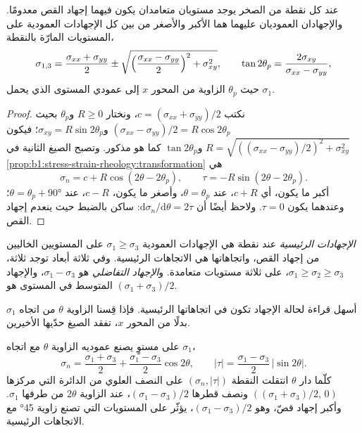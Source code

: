 \begin{theorem}\label{thm:b1:stress-strain-rheology:principal}
عند كل نقطة من الصخر يوجد مستويان متعامدان يكون فيهما إجهاد القص معدومًا. والإجهادان العموديان عليهما هما الأكبر والأصغر من بين كل الإجهادات العمودية على المستويات المارّة بالنقطة،
\[
  \sigma_{1,3} = \frac{\sigma_{xx}+\sigma_{yy}}{2} \pm
  \sqrt{\Bigl(\frac{\sigma_{xx}-\sigma_{yy}}{2}\Bigr)^2 + \sigma_{xy}^2},
  \qquad \tan2\theta_p = \frac{2\sigma_{xy}}{\sigma_{xx}-\sigma_{yy}},
\]
حيث $\theta_p$ الزاوية من المحور $x$ إلى عمودي المستوى الذي يحمل $\sigma_1$.
\end{theorem}

\begin{proof}
نكتب $c = (\sigma_{xx}+\sigma_{yy})/2$، ونختار $R \ge 0$ و$\theta_p$ بحيث $(\sigma_{xx}-\sigma_{yy})/2 = R\cos2\theta_p$ و$\sigma_{xy} = R\sin2\theta_p$؛ فيكون $R = \sqrt{((\sigma_{xx}-\sigma_{yy})/2)^2 + \sigma_{xy}^2}$ و$\tan2\theta_p$ كما هو مذكور. وتصبح الصيغ الثانية في \cref{prop:b1:stress-strain-rheology:transformation} هي
\[
  \sigma_n = c + R\cos(2\theta - 2\theta_p), \qquad \tau = -R\sin(2\theta - 2\theta_p).
\]
 أكبر ما يكون، أي $c + R$، عند $\theta = \theta_p$، وأصغر ما يكون، $c - R$، عند $\theta = \theta_p + \ang{90}$؛ وعندهما يكون $\tau = 0$. ولاحظ أيضًا أن $\mathrm d\sigma_n/\mathrm d\theta = 2\tau$:  ساكن بالضبط حيث ينعدم إجهاد القص.
\end{proof}

\begin{definition}\label{def:b1:stress-strain-rheology:principal}
\emph{الإجهادات الرئيسية} عند نقطة هي الإجهادات العمودية $\sigma_1 \ge \sigma_3$ على المستويين الخاليين من إجهاد القص، واتجاهاتها هي الاتجاهات الرئيسية. وفي ثلاثة أبعاد توجد ثلاثة، $\sigma_1 \ge \sigma_2 \ge \sigma_3$، على ثلاثة مستويات متعامدة. و\emph{الإجهاد التفاضلي} هو $\sigma_1 - \sigma_3$، والإجهاد المتوسط في المستوى هو $(\sigma_1+\sigma_3)/2$.
\end{definition}

أسهل قراءة لحالة الإجهاد تكون في اتجاهاتها الرئيسية. فإذا قِسنا الزاوية $\theta$ من اتجاه $\sigma_1$ بدلًا من المحور $x$، تفقد الصيغ حدّيها الأخيرين.

\begin{proposition}\label{prop:b1:stress-strain-rheology:mohr}
على مستوٍ يصنع عموديه الزاوية $\theta$ مع اتجاه $\sigma_1$،
\[
  \sigma_n = \frac{\sigma_1+\sigma_3}{2} + \frac{\sigma_1-\sigma_3}{2}\cos2\theta,
  \qquad
  |\tau| = \frac{\sigma_1-\sigma_3}{2}\,|\sin2\theta| .
\]
كلّما دار $\theta$ انتقلت النقطة $(\sigma_n, |\tau|)$ على النصف العلوي من الدائرة التي مركزها $((\sigma_1+\sigma_3)/2,\, 0)$ ونصف قطرها $(\sigma_1-\sigma_3)/2$، عند الزاوية $2\theta$ من طرفها $\sigma_1$. وأكبر إجهاد قصّ، وهو $(\sigma_1-\sigma_3)/2$، يؤثّر على المستويات التي تصنع زاوية \ang{45} مع الاتجاهات الرئيسية.
\end{proposition}

